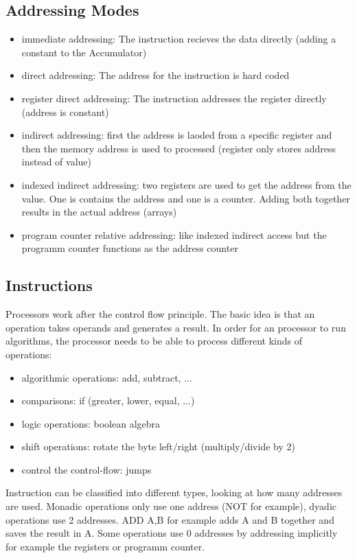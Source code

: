 \documentclass[a4paper]{scrartcl}
\begin{document}
            \subsection*{Addressing Modes}
            \begin{itemize}
                \item immediate addressing: The instruction recieves the data directly (adding a constant to the Accumulator)
                \item direct addressing: The address for the instruction is hard coded
                \item register direct addressing: The instruction addresses the register directly (address is constant) 
                \item indirect addressing: first the address is laoded from a specific register and then the memory address is used to processed (register only stores address instead of value)
                \item indexed indirect addressing: two registers are used to get the address from the value. One is contains the address and one is a counter. Adding both together results in the actual address (arrays)
                \item program counter relative addressing: like indexed indirect access but the programm counter functions as the address counter
            \end{itemize}

        \subsection{Instructions}
            Processors work after the control flow principle. The basic idea is that an operation takes operands and generates a result. In order for an processor to run 
            algorithms, the processor needs to be able to process different kinds of operations:
            \begin{itemize}
                \item algorithmic operations: add, subtract, ...
                \item comparisons: if (greater, lower, equal, ...)
                \item logic operations: boolean algebra
                \item shift operations: rotate the byte left/right (multiply/divide by 2)
                \item control the control-flow: jumps
            \end{itemize}
            Instruction can be classified into different types, looking at how many addresses are used. Monadic operations only use one address (NOT for example), dyadic 
            operations use 2 addresses. ADD A,B for example adds A and B together and saves the result in A. Some operations use 0 addresses by addressing implicitly for example the 
            registers or programm counter. 
\end{document}
